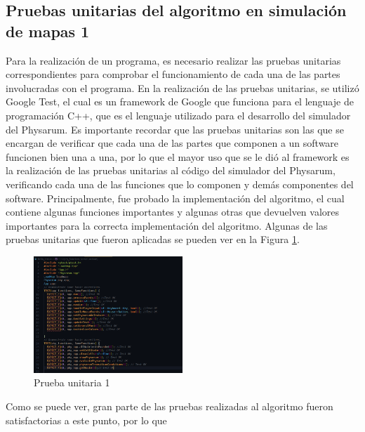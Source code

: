 \subsection{Pruebas unitarias del algoritmo en simulaci\'on de mapas 1} %
\label{sub:subsection name1}
    Para la realizaci\'on de un programa, es necesario realizar las
        pruebas unitarias correspondientes para comprobar el
        funcionamiento de cada una de las partes involucradas con el
        programa.
    \vskip 0.5cm
    En la realizaci\'on de las pruebas unitarias, se utiliz\'o Google
        Test, el cual es un framework de Google que funciona para el lenguaje de programaci\'on C++, que es el lenguaje
        utilizado para el desarrollo del simulador del Physarum. Es
        importante recordar que las pruebas unitarias son las que se
        encargan de verificar que cada una de las partes que
        componen a un software funcionen bien una a una, por lo
        que el mayor uso que se le di\'o al framework es la realizaci\'on
        de las pruebas unitarias al c\'odigo del simulador del
        Physarum, verificando cada una de las funciones que lo
        componen y dem\'as componentes del software.
    \vskip 0.5cm
    Principalmente, fue probado la implementaci\'on del
        algoritmo, el cual contiene algunas funciones importantes y
        algunas otras que devuelven valores importantes para la
        correcta implementaci\'on del algoritmo.
    \vskip 0.5cm
    Algunas de las pruebas unitarias que fueron aplicadas se pueden
        ver en la Figura \ref{fig:Prueba unitaria 1}.
    \vskip 0.5cm
    \begin{figure}[htbp]
        \centering
        \includegraphics[width=0.5\textwidth]{./images/Pruebas/simulador/image007.png}
        \caption{Prueba unitaria 1}
        \label{fig:Prueba unitaria 1}
    \end{figure}
    \vskip 0.5cm
    Como se puede ver, gran parte de las pruebas realizadas al
        algoritmo fueron satisfactorias a este punto, por lo que
